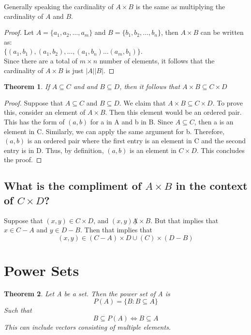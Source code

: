 \documentclass{article}
\newtheorem{theorem}{Theorem}[section]
\begin{document}
Generally speaking the cardinality of $A \times B$ is the same as multiplying the cardinality of $A$ and $B$. 

\begin{proof}
    Let $A = \{a_1,a_2,\dots,a_m\}$ and $B = \{b_1,b_2,\dots,b_n\}$, then $A \times B$ can be written as: \\
    $\{(a_1,b_1), (a_1,b_2), \dots, (a_1,b_n) \dots (a_m, b_1)\}$. \\
    Since there are a total of $m \times n$ number of elements, it follows that the cardinality of $A \times B$ is just $|A||B|$.
\end{proof}

\begin{theorem}
    If $A \subseteq C$ and and $B \subseteq D$, then it follows that $A \times B \subseteq C \times D$
\end{theorem}

\begin{proof}
    Suppose that $A \subseteq C$ and $B \subseteq D$. We claim that $A \times B \subseteq C \times D$. To prove this, consider an element of $A \times B$. Then this element would be an ordered pair. 
    This has the form of $(a,b)$ for a in A and b in B. Since $A \subseteq C$, then a is an element in C. Similarly, we can apply the same argument for b. 
    Therefore, $(a,b)$ is an ordered pair where the first entry is an element in C and the second entry is in D. Thus, by definition, $(a,b)$ is an element in $C \times D$. 
    This concludes the proof. 
\end{proof}

\subsection*{What is the compliment of $A \times B$ in the context of $C \times D$?}

Suppose that $(x,y) \in C \times D$, and $(x,y) \not A \times B$. But that implies that 
$x \in C-A$ and $y \in D-B$. Then that implies that 
\begin{equation}
    (x,y) \in (C - A) \times D \cup (C) \times (D - B)
\end{equation}

\section*{Power Sets}

\begin{theorem}
    Let A be a set. Then the power set of A is 
    \begin{equation}
        P(A) = \{B: B \subseteq A\}
    \end{equation}
    Such that 
    \begin{equation}
        B \subseteq P(A) \iff B \subseteq A
    \end{equation}
    This can include vectors consisting of multiple elements. 
\end{theorem}
\end{document}
